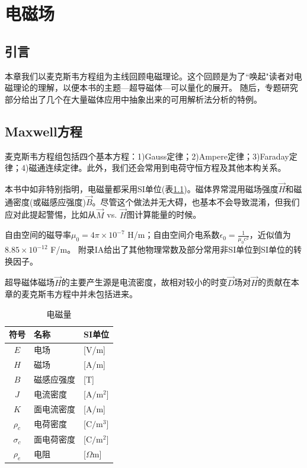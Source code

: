 \chapter{电磁场}
\section{引言}
本章我们以麦克斯韦方程组为主线回顾电磁理论。这个回顾是为了``唤起"读者对电磁理论的理解，以便本书的主题---超导磁体---可以量化的展开。
随后，专题研究部分给出了几个在大量磁体应用中抽象出来的可用解析法分析的特例。
\section{Maxwell方程}
麦克斯韦方程组包括四个基本方程：1)Gauss定律；2)Ampere定律；3)Faraday定律；4)磁通连续定律。此外，我们还会常用到电荷守恒方程及其他本构关系。

本书中如非特别指明，电磁量都采用SI单位(表\ref{emquantity})。磁体界常混用磁场强度$\vec{H}$和磁通密度(或磁感应强度)$\vec{B}$。尽管这个做法并无大碍，也基本不会导致混淆，但我们应对此提起警惕，比如从$\vec{M}$ vs. $\vec{H}$图计算能量的时候。

自由空间的磁导率$\mu_0=4\pi \times 10^{-7}$ H/m；自由空间介电系数$\epsilon_0=\frac{1}{\mu_0c^2}$，近似值为$8.85\times 10^{-12}$ F/m。
附录IA给出了其他物理常数及部分常用非SI单位到SI单位的转换因子。

超导磁体磁场$\vec{H}$的主要产生源是电流密度，故相对较小的时变$\vec{D}$场对$\vec{H}$的贡献在本章的麦克斯韦方程中并未包括进来。

\begin{table}[htbp]\small
  \centering
  \caption{电磁量} \label{emquantity}
\begin{tabular}{|c|l|l|}
  \hline
  符号 & 名称 & SI单位 \\ \hline
  $E$&电场&[V/m] \\ \hline
  $H$&磁场&[A/m] \\ \hline
  $B$&磁感应强度&[T]\\ \hline
  $J$&电流密度&[$\mathrm{A/m^2}$] \\ \hline
  $K$&面电流密度&[A/m]\\ \hline
  $\rho_c$&电荷密度&[$\mathrm{C/m^3}$]\\ \hline
  $\sigma_c$&面电荷密度&[$\mathrm{C/m^2}]$\\ \hline
  $\rho_e$&电阻&[$\Omega$m]\\
  \hline
\end{tabular}
\end{table}

